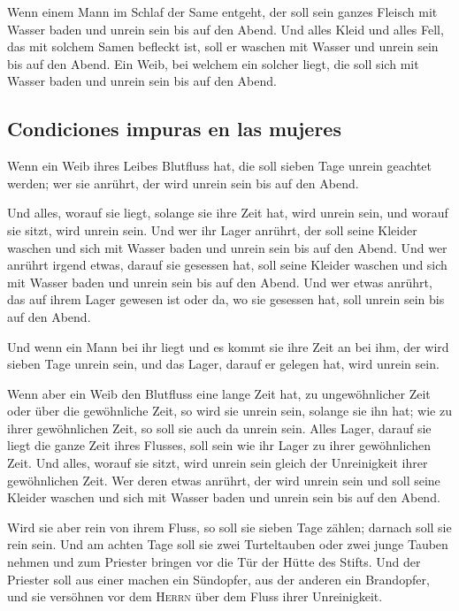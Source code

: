 Wenn einem Mann im Schlaf der Same entgeht, der soll
sein ganzes Fleisch mit Wasser baden und unrein sein bis auf den Abend.
 Und alles Kleid und alles Fell, das mit solchem Samen
befleckt ist, soll er waschen mit Wasser und unrein sein bis auf den
Abend.  Ein Weib, bei welchem ein solcher liegt, die soll
sich mit Wasser baden und unrein sein bis auf den Abend.

\hypertarget{condiciones-impuras-en-las-mujeres}{%
\subsection{Condiciones impuras en las
mujeres}\label{condiciones-impuras-en-las-mujeres}}

 Wenn ein Weib ihres Leibes Blutfluss hat, die soll
sieben Tage unrein geachtet werden; wer sie anrührt, der wird unrein
sein bis auf den Abend.

 Und alles, worauf sie liegt, solange sie ihre Zeit hat,
wird unrein sein, und worauf sie sitzt, wird unrein sein.
 Und wer ihr Lager anrührt, der soll seine Kleider
waschen und sich mit Wasser baden und unrein sein bis auf den Abend.
 Und wer anrührt irgend etwas, darauf sie gesessen hat,
soll seine Kleider waschen und sich mit Wasser baden und unrein sein bis
auf den Abend.  Und wer etwas anrührt, das auf ihrem
Lager gewesen ist oder da, wo sie gesessen hat, soll unrein sein bis auf
den Abend.

 Und wenn ein Mann bei ihr liegt und es kommt sie ihre
Zeit an bei ihm, der wird sieben Tage unrein sein, und das Lager, darauf
er gelegen hat, wird unrein sein.

 Wenn aber ein Weib den Blutfluss eine lange Zeit hat, zu
ungewöhnlicher Zeit oder über die gewöhnliche Zeit, so wird sie unrein
sein, solange sie ihn hat; wie zu ihrer gewöhnlichen Zeit, so soll sie
auch da unrein sein.  Alles Lager, darauf sie liegt die
ganze Zeit ihres Flusses, soll sein wie ihr Lager zu ihrer gewöhnlichen
Zeit. Und alles, worauf sie sitzt, wird unrein sein gleich der
Unreinigkeit ihrer gewöhnlichen Zeit.  Wer deren etwas
anrührt, der wird unrein sein und soll seine Kleider waschen und sich
mit Wasser baden und unrein sein bis auf den Abend.

 Wird sie aber rein von ihrem Fluss, so soll sie sieben
Tage zählen; darnach soll sie rein sein.  Und am achten
Tage soll sie zwei Turteltauben oder zwei junge Tauben nehmen und zum
Priester bringen vor die Tür der Hütte des Stifts.  Und
der Priester soll aus einer machen ein Sündopfer, aus der anderen ein
Brandopfer, und sie versöhnen vor dem \textsc{Herrn} über dem Fluss
ihrer Unreinigkeit.

